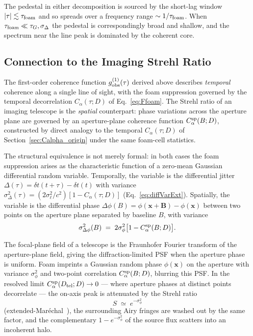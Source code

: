 \documentclass[aps,prd,onecolumn,amsmath,amssymb]{revtex4-2}
\begin{document}
The pedestal in either decomposition is sourced by the short-lag
window $|\tau|\lesssim\tau_{\rm foam}$ and so spreads over a frequency
range $\sim 1/\tau_{\rm foam}$.  When $\tau_{\rm foam}\ll
\tau_G,\sigma_\Delta$ the pedestal is correspondingly broad and
shallow, and the spectrum near the line peak is dominated by the coherent core.


\subsection{Connection to the Imaging Strehl Ratio}
\label{sec:connection}

The first-order coherence function $g^{(1)}_{\rm obs}(\tau)$ derived
above describes \emph{temporal} coherence along a single line of
sight, with the foam suppression governed by the temporal
decorrelation $C_\alpha(\tau;D)$ of Eq.~\eqref{eq:Ffoam}.  The Strehl
ratio of an imaging telescope is the \emph{spatial} counterpart:
phase variations across the aperture plane are governed by an
aperture-plane coherence function $C_\alpha^{\rm sp}(B;D)$, constructed
by direct analogy to the temporal $C_\alpha(\tau;D)$ of
Section~\ref{sec:Calpha_origin} under the same foam-cell statistics.

The structural equivalence is not merely formal: in both cases the
foam suppression arises as the characteristic function of a zero-mean
Gaussian differential random variable.  Temporally, the variable is
the differential jitter $\Delta(\tau)=\delta t(t+\tau)-\delta t(t)$
with variance $\sigma_\Delta^2(\tau)=(2\sigma_\ell^2/c^2)[1-C_\alpha(\tau;D)]$
(Eq.~\eqref{eq:diffVarExt}).  Spatially, the variable is the
differential phase
$\Delta\phi(B)=\phi(\mathbf{x}+\mathbf{B})-\phi(\mathbf{x})$
between two points on the aperture plane separated by baseline $B$,
with variance
\begin{equation}
  \sigma_{\Delta\phi}^2(B) \;=\; 2\sigma_\phi^2\bigl[1-C_\alpha^{\rm sp}(B;D)\bigr].
  \label{eq:dphi-variance}
\end{equation}

The focal-plane field of a telescope is the Fraunhofer Fourier
transform of the aperture-plane field, giving the diffraction-limited
PSF when the aperture phase is uniform.  Foam imprints a Gaussian
random phase $\phi(\mathbf{x})$ on the aperture with variance
$\sigma_\phi^2$ and two-point correlation $C_\alpha^{\rm sp}(B;D)$,
blurring this PSF.  In the resolved limit
$C_\alpha^{\rm sp}(D_{\rm tel};D)\to 0$ --- where aperture phases at
distinct points decorrelate --- the on-axis peak is attenuated by the
Strehl ratio
\begin{equation}
  S \;\simeq\; e^{-\sigma_\phi^2}
  \label{eq:strehl}
\end{equation}
(extended-Mar\'echal~\cite{NgPerlman2022}), the surrounding Airy
fringes are washed out by the same factor, and the complementary
$1-e^{-\sigma_\phi^2}$ of the source flux scatters into an incoherent
halo.
\end{document}
